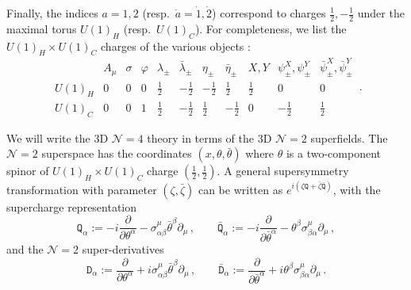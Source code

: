 \documentclass[12pt,a4paper]{article}
\renewcommand{\(}{\left(}
\renewcommand{\)}{\right)}
\renewcommand{\(}{\left(}
\renewcommand{\)}{\right)}
\begin{document}
Finally, the indices $a=1,2$ (resp.\ $\dot{a}=\dot{1},\dot{2}$) correspond to charges $\frac{1}{2},-\frac{1}{2}$ under the maximal torus $U(1)_H$ (resp.\ $U(1)_C$). 
For completeness, we list the $U(1)_H\times U(1)_C$ charges of the various objects \cite{Bullimore:2016nji}:
\begin{equation}\label{tab:charges}
\begin{array}{c|cccccccccc}
&A_\mu &\sigma&\varphi&\lambda_{\pm}&\bar{\lambda}_{\pm}&\eta_{\pm}&\bar{\eta}_{\pm} & X,Y &\psi^X_{\pm},\psi^Y_{\pm}&\bar{\psi}^X_{\pm},\bar{\psi}^Y_{\pm} \\
\hline   U(1)_H&0&0&0&\frac{1}{2}&-\frac{1}{2}&-\frac{1}{2}&\frac{1}{2}&\frac{1}{2}&0&0\\
U(1)_C&0&0&1&\frac{1}{2}&-\frac{1}{2}&\frac{1}{2}&-\frac{1}{2}&0&-\frac{1}{2}&\frac{1}{2}
\end{array}\,.
\end{equation}

\medskip
	
We will write the 3D $\mathcal{N}=4$ theory in terms of the 3D $\mathcal{N}=2$ superfields. 
The $\mathcal{N}=2$ superspace has the coordinates $(x,\theta,\bar{\theta})$ where $\theta$ is a two-component spinor of $U(1)_H\times U(1)_C$ charge $(\frac{1}{2},\frac{1}{2})$. 
A general supersymmetry transformation with parameter $(\zeta,\bar{\zeta})$ can be written as $e^{i(\zeta \mathtt{Q}+\bar{\zeta}\bar{\mathtt{Q}})}$, with the supercharge representation
\begin{equation}
\mathtt{Q}_{\alpha}:=-i\frac{\partial}{\partial\theta^\alpha}-\sigma^\mu_{\alpha\beta}\bar{\theta}^\beta\partial_\mu\,,
\qquad \bar{\mathtt{Q}}_{\alpha}:=-i\frac{\partial}{\partial\bar{\theta}^\alpha}-\theta^\beta\sigma^\mu_{\beta\alpha}\partial_\mu \,,   
\end{equation}
and the $\mathcal{N}=2$ super-derivatives 
\begin{equation}
\mathtt{D}_{\alpha}:=\frac{\partial}{\partial\theta^\alpha}+i\sigma^\mu_{\alpha\beta}\bar{\theta}^\beta\partial_\mu\,,
\qquad \bar{\mathtt{D}}_{\alpha}:=\frac{\partial}{\partial\bar{\theta}^\alpha}+i\theta^\beta\sigma^\mu_{\beta\alpha}\partial_\mu \,.    
\end{equation}
\end{document}
